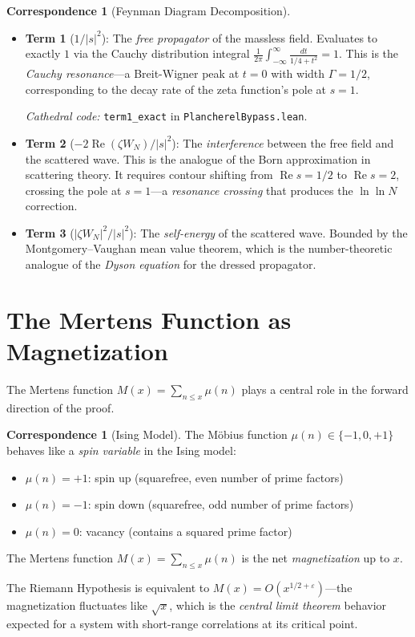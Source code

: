 \documentclass[11pt,a4paper]{article}
\theoremstyle{definition}
\newtheorem{correspondence}[definition]{Correspondence}
\newcommand{\re}{\operatorname{Re}}
\newcommand{\lean}[1]{\texttt{#1}}
\begin{document}
\begin{correspondence}[Feynman Diagram Decomposition]
\begin{itemize}
  \item \textbf{Term 1} ($1/|s|^2$): The \emph{free propagator} of the
    massless field. Evaluates to exactly $1$ via the Cauchy distribution
    integral $\frac{1}{2\pi}\int_{-\infty}^\infty \frac{dt}{1/4+t^2} = 1$.
    This is the \emph{Cauchy resonance}---a Breit-Wigner peak at $t=0$
    with width $\Gamma = 1/2$, corresponding to the decay rate of
    the zeta function's pole at $s=1$.

    \emph{Cathedral code:} \lean{term1\_exact} in \lean{PlancherelBypass.lean}.

  \item \textbf{Term 2} ($-2\re(\zeta W_N)/|s|^2$): The \emph{interference}
    between the free field and the scattered wave. This is the analogue of
    the Born approximation in scattering theory. It requires contour shifting
    from $\re s = 1/2$ to $\re s = 2$, crossing the pole at $s=1$---a
    \emph{resonance crossing} that produces the $\ln\ln N$ correction.

  \item \textbf{Term 3} ($|\zeta W_N|^2/|s|^2$): The \emph{self-energy}
    of the scattered wave. Bounded by the Montgomery--Vaughan mean value
    theorem, which is the number-theoretic analogue of the \emph{Dyson
    equation} for the dressed propagator.
\end{itemize}
\end{correspondence}

\section{The Mertens Function as Magnetization}
\label{sec:mertens}

The Mertens function $M(x) = \sum_{n \leq x} \mu(n)$ plays a central
role in the forward direction of the proof.

\begin{correspondence}[Ising Model]
The M\"obius function $\mu(n) \in \{-1, 0, +1\}$ behaves like a
\emph{spin variable} in the Ising model:
\begin{itemize}
  \item $\mu(n) = +1$: spin up (squarefree, even number of prime factors)
  \item $\mu(n) = -1$: spin down (squarefree, odd number of prime factors)
  \item $\mu(n) = 0$: vacancy (contains a squared prime factor)
\end{itemize}
The Mertens function $M(x) = \sum_{n \leq x} \mu(n)$ is the net
\emph{magnetization} up to $x$.

The Riemann Hypothesis is equivalent to $M(x) = O(x^{1/2+\varepsilon})$---the
magnetization fluctuates like $\sqrt{x}$, which is the \emph{central limit
theorem} behavior expected for a system with short-range correlations at
its critical point.
\end{correspondence}
\end{document}
